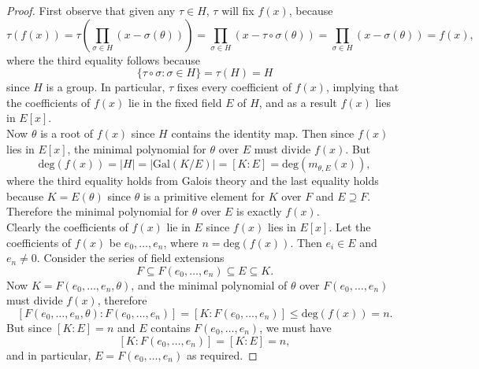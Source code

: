 \documentclass{article}
\begin{document}
  \begin{proof}
    First observe that given any $\tau\in H$, $\tau$ will fix $f(x)$,
    because
    \[\tau(f(x)) =\tau\left( \prod_{\sigma\in H} (x-\sigma(\theta))\right)
    =\prod_{\sigma\in H} (x-\tau\circ\sigma(\theta)) =\prod_{\sigma\in H}
    (x-\sigma(\theta)) =f(x),\]
    where the third equality follows because
    \[\{\tau\circ\sigma: \sigma\in H\} =\tau(H) =H\]
    since $H$ is a group. In particular, $\tau$ fixes every coefficient of
    $f(x)$, implying that the coefficients of $f(x)$ lie in the fixed field
    $E$ of $H$, and as a result $f(x)$ lies in $E[x]$. \\

    Now $\theta$ is a root of $f(x)$ since $H$ contains the identity map.
    Then since $f(x)$ lies in $E[x]$, the minimal polynomial for $\theta$
    over $E$ must divide $f(x)$. But
    \[\text{deg}(f(x)) =|H| =|\text{Gal}(K/E)| =[K:E]
    =\text{deg}(m_{\theta,E}(x)),\]
    where the third equality holds from Galois theory and the last equality
    holds because $K=E(\theta)$ since $\theta$ is a primitive element for
    $K$ over $F$ and $E\supseteq F$. Therefore the minimal polynomial for
    $\theta$ over $E$ is exactly $f(x)$. \\

    Clearly the coefficients of $f(x)$ lie in $E$ since $f(x)$ lies in
    $E[x]$. Let the coefficients of $f(x)$ be $e_0,\ldots,e_n$, where
    $n=\text{deg}(f(x))$. Then $e_i\in E$ and $e_n\neq0$. Consider the
    series of field extensions
    \[F \subseteq F(e_0,\ldots,e_n)\subseteq E \subseteq K.\]
    Now $K=F(e_0,\ldots,e_n,\theta)$, and the minimal polynomial of
    $\theta$ over $F(e_0,\ldots,e_n)$ must divide $f(x)$, therefore
    \[[F(e_0,\ldots,e_n,\theta):F(e_0,\ldots,e_n)] =[K:F(e_0,\ldots,e_n)]
    \leq \text{deg}(f(x))=n.\]
    But since $[K:E]=n$ and $E$ contains $F(e_0,\ldots,e_n)$, we must have
    \[[K:F(e_0,\ldots,e_n)]=[K:E]=n,\]
    and in particular, $E=F(e_0,\ldots,e_n)$ as required.
  \end{proof}
\end{document}

